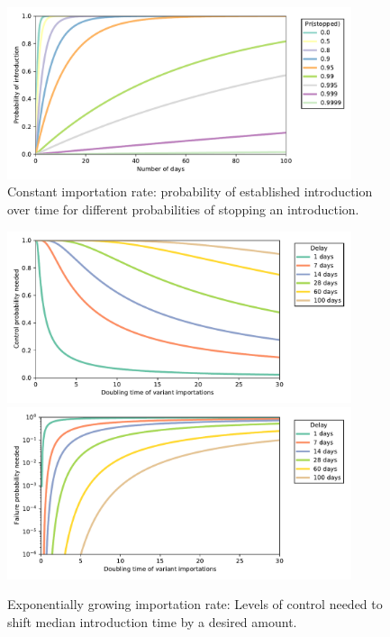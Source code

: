 \documentclass[10pt,a4paper]{article}
\begin{document}
\begin{figure}
\centering
\includegraphics[width=0.9\textwidth]{./var_F.pdf}
\caption{Constant importation rate: probability of established introduction over
time for different probabilities of stopping an introduction.}
\label{fig:F}
\end{figure}

\begin{figure}
\centering
\includegraphics[width=0.9\textwidth]{./var_q.pdf}\\
\includegraphics[width=0.9\textwidth]{./var_q_log.pdf}
\caption{Exponentially growing importation rate: Levels of control needed to shift median
introduction time by a desired amount.}
\label{fig:q}
\end{figure}

\clearpage
\end{document}
